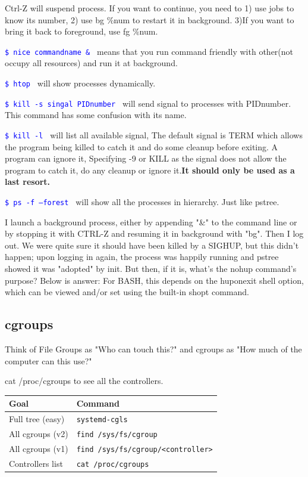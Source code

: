 \documentclass[paper=8.5in:11in, twoside, 12pt, pagesize=pdftex]{book}
\newcommand{\linuxcommand}[1]{\texttt{\textcolor{blue}{\$ #1 \Pisymbol{psy}{191}}}}
\begin{document}
	\par Ctrl-Z will suspend process. If you want to continue, you need to 1) use jobs to know its number, 2) use bg \%num to restart it in background. 3)If you want to bring it back to foreground, use fg \%num. 

	\linuxcommand{nice commandname \&} means that you run command friendly with other(not occupy all resources) and run it at background. 
	
	\linuxcommand{htop} will show processes dynamically.

	\linuxcommand{kill -s singal PIDnumber} will send signal to processes with PIDnumber. This command has some confusion with its name.

	\linuxcommand{kill -l } will list all available signal, The default signal is TERM which allows the program being killed to catch it and do some cleanup before exiting. A program can ignore it, Specifying -9 or KILL as the signal does not allow the program to catch it, do any cleanup or ignore it.\textbf{It should only be used as a last resort.}
 
	\linuxcommand{ps -f --forest} will show all the processes in hierarchy.  Just like pstree.  

	I launch a background process, either by appending "\&" to the command line or by stopping it with CTRL-Z and resuming it in background with "bg". Then I log out.  We were quite sure it should have been killed by a SIGHUP, but this didn't happen; upon logging in again, the process was happily running and pstree showed it was "adopted" by init. But then, if it is, what's the nohup command's purpose? Below is answer: For BASH, this depends on the huponexit shell option, which can be viewed and/or set using the built-in shopt command.

\subsection{cgroups}

\par Think of File Groups as "Who can touch this?" and cgroups as "How much of the computer can this use?"

cat /proc/cgroups to see all the controllers.


\begin{tabular}{|l|l|}
\hline
\textbf{Goal} & \textbf{Command} \\
\hline
Full tree (easy) & \texttt{systemd-cgls} \\
\hline
All cgroups (v2) & \texttt{find /sys/fs/cgroup} \\
\hline
All cgroups (v1) & \texttt{find /sys/fs/cgroup/<controller>} \\
\hline
Controllers list & \texttt{cat /proc/cgroups} \\
\hline
\end{tabular}
\end{document}
